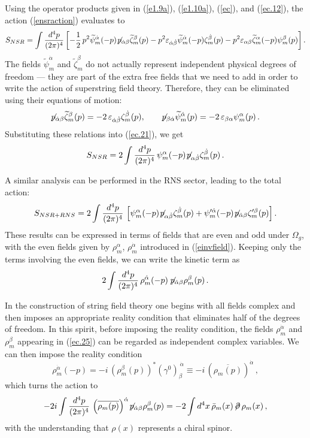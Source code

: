 \documentclass[12pt,a4paper]{article}
\newcommand{\be}{\begin{equation}}
\newcommand{\ee}{\end{equation}}
\newcommand{\refb}[1]{(\ref{#1})}
\newcommand{\I}{\mathrm{i}}
\def\({\left(}
\def\){\right)}
\def\[{\left[}
\def\]{\right]}
\newcommand{\ve}{\varepsilon}
\newcommand{\wt}{\widetilde}
\newcommand{\dalpha}{\beta}
\def\dalpha{{\dot\alpha}}
\def\dbeta{{\dot\beta}}
\def\sp{\not  \hskip -.04in p}
\def\I{i}
\def\xxi{\rho}
\def\cfi{\zeta}
\newcommand{\oo}{{$\Omega_g$}}
\begin{document}
Using the operator products given in \refb{e1.9a}, \refb{e1.10a}, \refb{ec}, and \refb{ec.12},
the action \refb{ensraction} evaluates to
\be\label{ec.21}
S_{NSR} =  \int{d^{4}p\over (2\pi)^{4}} \[-{1\over 2}\,
p^2  \wt\psi_m^\dalpha(-p)\! \sp_{\dalpha\beta} \wt \cfi_m^\beta(p)
- p^2 \ve_{\dalpha\dbeta} \wt\psi_m^\dalpha(-p) \cfi_m^\dbeta(p) -
p^2 \ve_{\alpha\beta} \wt\cfi_m^\alpha(-p) \psi_m^\beta(p) \] .
\ee
The fields $\wt\psi_m^\dalpha$ and $\wt \cfi_m^\beta$ do not actually represent independent physical
degrees of freedom --- they are part of the extra free fields that we need to add in order
to write the action of superstring field theory. Therefore, they can be eliminated using their
equations of motion:
\be
\sp_{\dalpha\beta} \wt \cfi_m^\beta(p)=-2\,  \ve_{\dalpha\dbeta}  \cfi_m^\dbeta(p),
\qquad
\sp_{\beta\dalpha} \wt\psi_m^\dalpha(p) = - 2\, \ve_{\beta\alpha}  \psi_m^\alpha(p)\, .
\ee
Substituting these relations into \refb{ec.21}, we get
\be
S_{NSR} = 2 \int{d^{4}p\over (2\pi)^{4}}\, \psi_m^\alpha(-p) \!\sp_{\alpha\dbeta} \cfi_m^\dbeta(p)\, .
\ee

A similar analysis can be performed in the RNS sector, leading to the total action:
\be
S_{NSR+RNS} = 2 \int{d^{4}p\over (2\pi)^{4}}\, \[
\psi_m^\alpha(-p) \!\sp_{\alpha\dbeta} \cfi_m^\dbeta(p) +
\psi_m^{\prime\dalpha}(-p)\! \sp_{\dalpha\beta} \cfi_m^{\prime\beta}(p)\] .
\ee
These results can be expressed in terms of fields that are even and odd under \oo,
with the even fields given by $\xxi_m^\alpha$, $\xxi_m^\dalpha$ introduced in \refb{einvfield}.
Keeping only the terms involving the even  fields, we can write
the kinetic term as
\be\label{ec.25}
2 \int{d^{4}p\over (2\pi)^{4}}\,
\xxi_m^\dalpha(-p) \sp_{\dalpha\beta} \xxi_m^\beta(p) \, .
\ee

In the construction of string field
theory one begins with all fields complex and then imposes an appropriate reality condition that
eliminates half of the degrees of freedom. In this spirit, before imposing the reality condition,
the fields $\xxi_m^\dalpha$ and
$\xxi_m^\beta$
appearing in \refb{ec.25} can be regarded as independent complex variables. We can
then impose the reality condition
\be \label{ereality}
\xxi_m^\dalpha(-p)= -\I\, (\xxi_m^\beta(p))^* (\gamma^0)_\beta^{~\dalpha}\equiv
- \I \, \(\overline{\xxi_m(p)}\)^\dalpha\, ,
\ee
which turns the action to
\be\label{ec.26}
-2 \I \int{d^{4}p\over (2\pi)^{4}}\,
\(\overline{\xxi_m(p)}\)^\dalpha \!\sp_{\dalpha\beta} \xxi_m^\beta(p)
= -2 \int d^4 x \, \bar{\xxi}_m(x)\! \not\!\partial \,  \xxi_m(x)\, ,
\ee
with the understanding that $\xxi(x)$ represents a chiral spinor.
\end{document}

